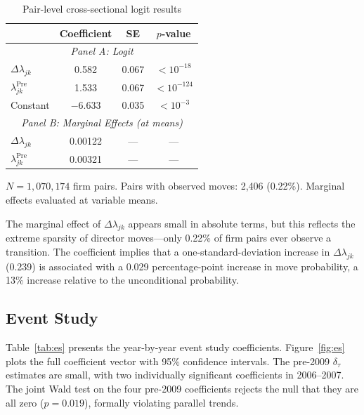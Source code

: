 \documentclass[11pt,a4paper]{article}
\begin{document}
\begin{table}[h!]
\centering
\begin{threeparttable}
\begin{tabular}{lccc}
\toprule
 & \textbf{Coefficient} & \textbf{SE} & \textbf{$p$-value} \\
\midrule
\multicolumn{4}{c}{\textit{Panel A: Logit}} \\
$\Delta\lambda_{jk}$ & 0.582 & 0.067 & $<10^{-18}$ \\
$\lambda_{jk}^{\text{Pre}}$ & 1.533 & 0.067 & $<10^{-124}$ \\
Constant & $-6.633$ & 0.035 & $<10^{-3}$ \\
\midrule
\multicolumn{4}{c}{\textit{Panel B: Marginal Effects (at means)}} \\
$\Delta\lambda_{jk}$ & 0.00122 & --- & --- \\
$\lambda_{jk}^{\text{Pre}}$ & 0.00321 & --- & --- \\
\bottomrule
\end{tabular}
\begin{tablenotes}
\footnotesize
\item $N = 1{,}070{,}174$ firm pairs. Pairs with observed moves: 2,406 (0.22\%). Marginal effects evaluated at variable means.
\end{tablenotes}
\end{threeparttable}
\caption{Pair-level cross-sectional logit results}
\label{tab:pair}
\end{table}

The marginal effect of $\Delta\lambda_{jk}$ appears small in absolute terms, but this reflects the extreme sparsity of director moves---only 0.22\% of firm pairs ever observe a transition. The coefficient implies that a one-standard-deviation increase in $\Delta\lambda_{jk}$ (0.239) is associated with a 0.029 percentage-point increase in move probability, a 13\% increase relative to the unconditional probability.

\subsection{Event Study}

Table~\ref{tab:es} presents the year-by-year event study coefficients. Figure~\ref{fig:es} plots the full coefficient vector with 95\% confidence intervals. The pre-2009 $\delta_\tau$ estimates are small, with two individually significant coefficients in 2006--2007. The joint Wald test on the four pre-2009 coefficients rejects the null that they are all zero ($p=0.019$), formally violating parallel trends.
\end{document}
